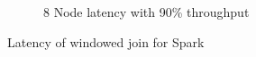 \begin{figure}
\begin{subfigure}[b]{0.3\textwidth}
       \caption{8 Node latency with 90\% throughput }
   \end{subfigure}



        \caption{Latency of windowed join for Spark}
\end{figure}